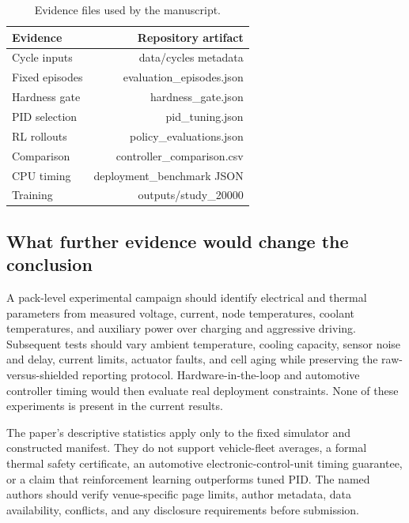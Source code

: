 \documentclass[conference]{IEEEtran}
\begin{document}
\begin{table}[t]
\caption{Evidence files used by the manuscript.}
\label{tab:XI}
\centering\footnotesize
\begin{tabular}{lr}
\toprule
Evidence & Repository artifact\\
\midrule
Cycle inputs & data/cycles metadata\\
Fixed episodes & evaluation\_episodes.json\\
Hardness gate & hardness\_gate.json\\
PID selection & pid\_tuning.json\\
RL rollouts & policy\_evaluations.json\\
Comparison & controller\_comparison.csv\\
CPU timing & deployment\_benchmark JSON\\
Training & outputs/study\_20000\\
\bottomrule
\end{tabular}
\end{table}
\subsection{What further evidence would change the conclusion}
A pack-level experimental campaign should identify electrical and thermal parameters from measured voltage, current, node temperatures, coolant temperatures, and auxiliary power over charging and aggressive driving. Subsequent tests should vary ambient temperature, cooling capacity, sensor noise and delay, current limits, actuator faults, and cell aging while preserving the raw-versus-shielded reporting protocol. Hardware-in-the-loop and automotive controller timing would then evaluate real deployment constraints. None of these experiments is present in the current results.

The paper's descriptive statistics apply only to the fixed simulator and constructed manifest. They do not support vehicle-fleet averages, a formal thermal safety certificate, an automotive electronic-control-unit timing guarantee, or a claim that reinforcement learning outperforms tuned PID. The named authors should verify venue-specific page limits, author metadata, data availability, conflicts, and any disclosure requirements before submission.
\end{document}
